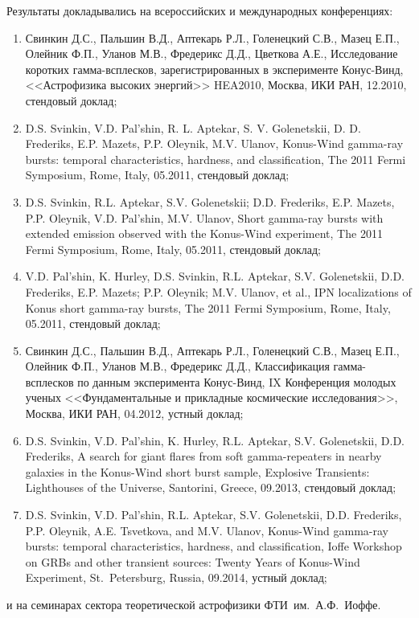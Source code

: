 Результаты докладывались на всероссийских и международных конференциях: 
\begin{enumerate}
\item Свинкин Д.С., Пальшин В.Д., Аптекарь Р.Л., Голенецкий С.В., Мазец Е.П., 
    Олейник Ф.П., Уланов М.В., Фредерикс Д.Д., Цветкова А.Е., 
    Исследование коротких гамма-всплесков, зарегистрированных в эксперименте Конус-Винд,
    <<Астрофизика высоких энергий>> HEA2010, Москва, ИКИ РАН, 12.2010, стендовый доклад;
\item D.S. Svinkin, V.D. Pal'shin, R. L. Aptekar, S. V. Golenetskii, D. D. Frederiks, 
    E.P. Mazets, P.P. Oleynik, M.V. Ulanov, 
    Konus-Wind gamma-ray bursts: temporal characteristics, hardness, and classification, 
    The 2011 Fermi Symposium, Rome, Italy, 05.2011, стендовый доклад;
\item D.S. Svinkin, R.L. Aptekar, S.V. Golenetskii; D.D. Frederiks, E.P. Mazets,
    P.P. Oleynik, V.D. Pal'shin, M.V. Ulanov, 
    Short gamma-ray bursts with extended emission observed with the Konus-Wind experiment,
    The 2011 Fermi Symposium, Rome, Italy, 05.2011, стендовый доклад;
\item V.D. Pal'shin, K. Hurley, D.S. Svinkin, R.L. Aptekar, S.V. Golenetskii, 
    D.D. Frederiks, E.P. Mazets; P.P. Oleynik; M.V. Ulanov, et al., 
    IPN localizations of Konus short gamma-ray bursts, 
    The 2011 Fermi Symposium, Rome, Italy, 05.2011, стендовый доклад;
\item Свинкин Д.С., Пальшин В.Д., Аптекарь Р.Л., Голенецкий С.В., Мазец Е.П., 
    Олейник Ф.П., Уланов М.В., Фредерикс Д.Д., 
    Классификация гамма-всплесков по данным эксперимента Конус-Винд,
    IX Конференция молодых ученых <<Фундаментальные и прикладные космические исследования>>, 
    Москва, ИКИ РАН, 04.2012, устный доклад;
\item D.S. Svinkin, V.D. Pal'shin, K. Hurley, R.L. Aptekar, S.V. Golenetskii, D.D. Frederiks, 
    A search for giant flares from soft gamma-repeaters in nearby galaxies in the Konus-Wind short burst sample,
    Explosive Transients: Lighthouses of the Universe, Santorini, Greece, 09.2013, стендовый доклад;
\item D.S. Svinkin, V.D. Pal'shin, R.L. Aptekar, S.V. Golenetskii, D.D. Frederiks, 
    P.P. Oleynik, A.E. Tsvetkova, and M.V. Ulanov,
    Konus-Wind gamma-ray bursts: temporal characteristics, hardness, and classification,
    Ioffe Workshop on GRBs and other transient sources: Twenty Years of Konus-Wind Experiment, 
    St.~Petersburg, Russia, 09.2014, устный доклад;
\end{enumerate}
и на семинарах сектора теоретической астрофизики ФТИ~им.~А.Ф.~Иоффе.

\clearpage